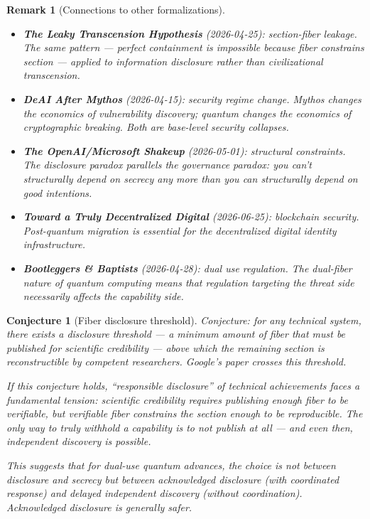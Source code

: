 \documentclass[11pt,a4paper]{article}
\newtheorem{conjecture}[definition]{Conjecture}
\newtheorem{remark}[definition]{Remark}
\begin{document}
\begin{remark}[Connections to other formalizations]
\begin{itemize}
\item \textbf{The Leaky Transcension Hypothesis} (2026-04-25):
  section-fiber leakage. The same pattern --- perfect containment
  is impossible because fiber constrains section --- applied to
  information disclosure rather than civilizational transcension.
\item \textbf{DeAI After Mythos} (2026-04-15): security regime change.
  Mythos changes the economics of vulnerability discovery; quantum
  changes the economics of cryptographic breaking. Both are
  base-level security collapses.
\item \textbf{The OpenAI/Microsoft Shakeup} (2026-05-01): structural
  constraints. The disclosure paradox parallels the governance
  paradox: you can't structurally depend on secrecy any more than
  you can structurally depend on good intentions.
\item \textbf{Toward a Truly Decentralized Digital} (2026-06-25):
  blockchain security. Post-quantum migration is essential for
  the decentralized digital identity infrastructure.
\item \textbf{Bootleggers \& Baptists} (2026-04-28): dual use
  regulation. The dual-fiber nature of quantum computing means
  that regulation targeting the threat side necessarily affects
  the capability side.
\end{itemize}
\end{remark}

\begin{conjecture}[Fiber disclosure threshold]
Conjecture: for any technical system, there exists a disclosure threshold
--- a minimum amount of fiber that must be published for scientific
credibility --- above which the remaining section is reconstructible
by competent researchers. Google's paper crosses this threshold.

If this conjecture holds, ``responsible disclosure'' of technical
achievements faces a fundamental tension: scientific credibility
requires publishing enough fiber to be verifiable, but verifiable
fiber constrains the section enough to be reproducible. The only
way to truly withhold a capability is to not publish at all ---
and even then, independent discovery is possible.

This suggests that for dual-use quantum advances, the choice is not
between disclosure and secrecy but between acknowledged disclosure
(with coordinated response) and delayed independent discovery (without
coordination). Acknowledged disclosure is generally safer.
\end{conjecture}
\end{document}
